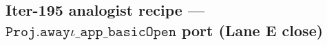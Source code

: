 \subsection*{Iter-195 analogist recipe --- \(\mathtt{Proj.awayι\_app\_basicOpen}\) port (Lane E close)}
